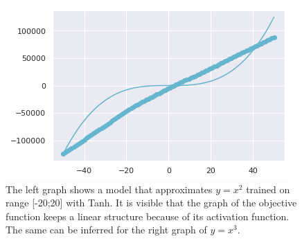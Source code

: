 \documentclass{article}
\begin{document}
\begin{figure}[h!]
\begin{multicols}{2}
    \includegraphics[width=\linewidth]{Tanhx3.png}\par
\end{multicols}
\caption{The left graph shows a model that approximates $y = x^2$ trained on range [-20;20] with Tanh. It is visible that the graph of the objective function keeps a linear structure because of its activation function. The same can be inferred for the right graph of $y=x^3$.}
\end{figure}
\end{document}
